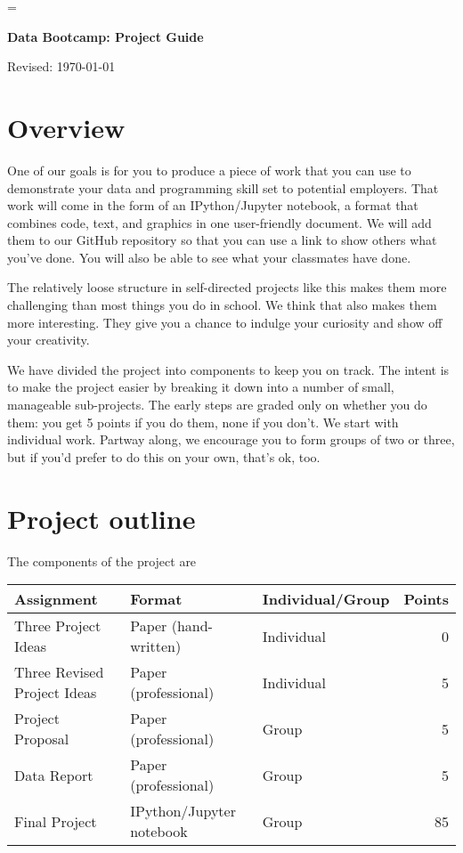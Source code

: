 \documentclass[11pt]{article}
\begin{document}
\parskip=\bigskipamount
\parindent=0.0in
\thispagestyle{empty}


\bigskip\bigskip
\centerline{\Large \bf Data Bootcamp:  Project Guide}
\centerline{Revised: \today}

\section*{Overview}

One of our goals is for you to produce a piece of work that you can use
to demonstrate your data and programming skill set to potential employers.
That work will come in the form of an IPython/Jupyter notebook,
a format that combines code, text, and graphics in one user-friendly document.
We will add them to our GitHub repository so that
you can use a link to show others what you've done.
You will also be able to see what your classmates have done.

The relatively loose structure in self-directed projects like this
makes them more challenging than most things you do in school.
We think that also makes them more interesting.
They give you a chance to
indulge your curiosity and show off your creativity.

We have divided the project into components to keep you on track.
The intent is to make the project easier by breaking it down into a number
of small, manageable sub-projects.
The early steps are graded only on whether you do them:
you get 5 points if you do them, none if you don't.
We start with individual work.  Partway along, we encourage you to form groups
of two or three, but if you'd prefer to do this on your own,
that's ok, too.


\section*{Project outline}

The components of the project are
%
\begin{center}
\begin{tabular}{lllr}
\toprule
Assignment                  & Format  & Individual/Group &  Points \\
\midrule
Three Project Ideas         & Paper (hand-written)  & Individual  & 0  \\
Three Revised Project Ideas & Paper (professional)  & Individual  & 5  \\
Project Proposal            & Paper (professional)  & Group       & 5  \\
Data Report                 & Paper (professional)  & Group       & 5  \\
Final Project               & IPython/Jupyter notebook      & Group       & 85 \\
\bottomrule
\end{tabular}
\end{center}
\end{document}
